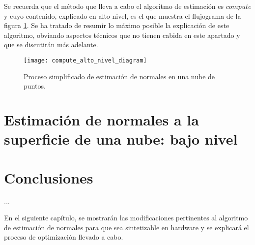 Se recuerda que el método que lleva a cabo el algoritmo de estimación es $compute$ y cuyo contenido, explicado en alto nivel, es el que muestra el flujograma de la figura \ref{fig:compute_alto_nivel_diagram}.
Se ha tratado de resumir lo máximo posible la explicación de este algoritmo, obviando aspectos técnicos que no tienen cabida en este apartado y que se discutirán más adelante. 



\begin{figure}[!htb]
\centering
{}
  \texttt{[image: compute\_alto\_nivel\_diagram]}
  \caption{Proceso simplificado de estimación de normales en una nube de puntos.}\label{fig:compute_alto_nivel_diagram}
\endminipage\hfill

\end{figure}

\section{Estimación de normales a la superficie de una nube: bajo nivel}


\section{Conclusiones}
...

En el siguiente capítulo, se mostrarán las modificaciones pertinentes al algoritmo de estimación de normales para que sea sintetizable en hardware y se explicará el proceso de optimización llevado a cabo.
